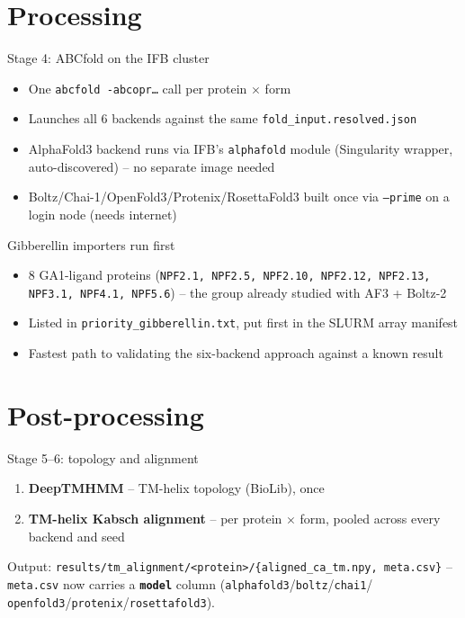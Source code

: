 \documentclass[aspectratio=169]{beamer}
\begin{document}
\section{Processing}

\begin{frame}{Stage 4: ABCfold on the IFB cluster}
  \begin{itemize}
    \item One \texttt{abcfold -abcopr\ldots} call per protein $\times$ form
    \item Launches all 6 backends against the same
      \texttt{fold\_input.resolved.json}
    \item AlphaFold3 backend runs via IFB's \texttt{alphafold} module
      (Singularity wrapper, auto-discovered) -- no separate image needed
    \item Boltz/Chai-1/OpenFold3/Protenix/RosettaFold3 built once via
      \texttt{--prime} on a login node (needs internet)
  \end{itemize}
\end{frame}

\begin{frame}{Gibberellin importers run first}
  \begin{itemize}
    \item 8 GA1-ligand proteins (\texttt{NPF2.1, NPF2.5, NPF2.10, NPF2.12,
      NPF2.13, NPF3.1, NPF4.1, NPF5.6}) -- the group already studied with
      AF3 + Boltz-2
    \item Listed in \texttt{priority\_gibberellin.txt}, put first in the
      SLURM array manifest
    \item Fastest path to validating the six-backend approach against a
      known result
  \end{itemize}
\end{frame}

\section{Post-processing}

\begin{frame}{Stage 5--6: topology and alignment}
  \begin{enumerate}
    \item \textbf{DeepTMHMM} -- TM-helix topology (BioLib), once
    \item \textbf{TM-helix Kabsch alignment} -- per protein $\times$ form,
      pooled across every backend and seed
  \end{enumerate}
  \vspace{0.5em}
  Output: \texttt{results/tm\_alignment/<protein>/\{aligned\_ca\_tm.npy,
  meta.csv\}} -- \texttt{meta.csv} now carries a \textbf{\texttt{model}}
  column (\texttt{alphafold3}/\texttt{boltz}/\texttt{chai1}/
  \texttt{openfold3}/\texttt{protenix}/\texttt{rosettafold3}).
\end{frame}
\end{document}
